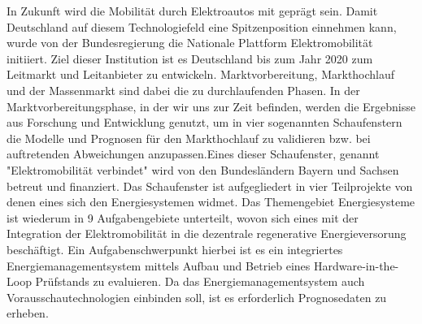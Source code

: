 In Zukunft wird die Mobilität durch Elektroautos mit geprägt sein. Damit Deutschland auf diesem Technologiefeld eine Spitzenposition einnehmen kann, wurde von der Bundesregierung die Nationale Plattform Elektromobilität initiiert. Ziel dieser Institution ist es Deutschland bis zum Jahr 2020 zum Leitmarkt und Leitanbieter zu entwickeln. Marktvorbereitung, Markthochlauf und der Massenmarkt sind dabei die zu durchlaufenden Phasen. In der Marktvorbereitungsphase, in der wir uns zur Zeit befinden, werden die Ergebnisse aus Forschung und Entwicklung genutzt, um in vier sogenannten Schaufenstern die Modelle und Prognosen für den Markthochlauf zu validieren bzw. bei auftretenden Abweichungen anzupassen.\cite{NPE}Eines dieser Schaufenster, genannt "{}Elektromobilität verbindet"{} wird von den Bundesländern Bayern und Sachsen betreut und finanziert. Das Schaufenster ist aufgegliedert in vier Teilprojekte von denen eines sich den Energiesystemen widmet. Das Themengebiet Energiesysteme ist wiederum in 9 Aufgabengebiete unterteilt, wovon sich eines mit der Integration der Elektromobilität in die dezentrale regenerative Energieversorung beschäftigt. Ein Aufgabenschwerpunkt hierbei ist es ein integriertes Energiemanagementsystem mittels Aufbau und Betrieb eines Hardware-in-the-Loop Prüfstands zu evaluieren. Da das Energiemanagementsystem auch Vorausschautechnologien einbinden soll, ist es erforderlich Prognosedaten zu erheben.\cite{SEEV}     
